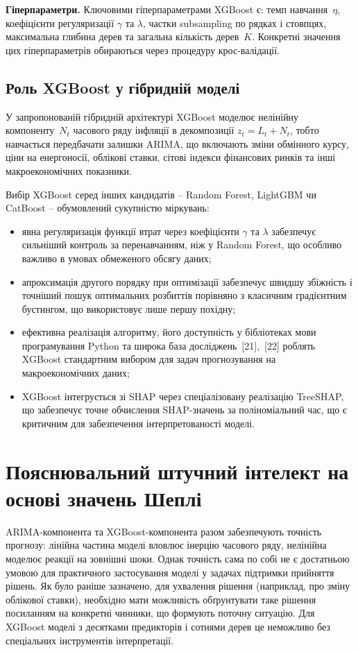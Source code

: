 \documentclass{bachelor_thesis}
\begin{document}
\textbf{Гіперпараметри.} Ключовими гіперпараметрами XGBoost є: темп навчання~$\eta$, коефіцієнти регуляризації $\gamma$ та $\lambda$, частки subsampling по рядках і стовпцях, максимальна глибина дерев та загальна кількість дерев~$K$. Конкретні значення цих гіперпараметрів обираються через процедуру крос-валідації.

\subsection{Роль XGBoost у гібридній моделі}

У запропонованій гібридній архітектурі XGBoost моделює нелінійну компоненту~$N_t$ часового ряду інфляції в декомпозиції $z_t = L_t + N_t$, тобто навчається передбачати залишки ARIMA, що включають зміни обмінного курсу, ціни на енергоносії, облікові ставки, сітові індекси фінансових ринків та інші макроекономічних показники.

Вибір XGBoost серед інших кандидатів -- Random Forest, LightGBM чи CatBoost -- обумовлений сукупністю міркувань:

\begin{itemize}
    \item явна регуляризація функції втрат через коефіцієнти $\gamma$ та $\lambda$ забезпечує сильніший контроль за перенавчанням, ніж у Random Forest, що особливо важливо в умовах обмеженого обсягу даних;
    \item апроксимація другого порядку при оптимізації забезпечує швидшу збіжність і точніший пошук оптимальних розбиттів порівняно з класичним градієнтним бустингом, що використовує лише першу похідну;
    \item ефективна реалізація алгоритму, його доступність у бібліотеках мови програмування Python та широка база досліджень~[21],~[22] роблять XGBoost стандартним вибором для задач прогнозування на макроекономічних даних;
    \item XGBoost інтегрується зі SHAP через спеціалізовану реалізацію TreeSHAP, що забезпечує точне обчислення SHAP-значень за поліноміальний час, що є критичним для забезпечення інтерпретованості моделі.
\end{itemize}

\section{Пояснювальний штучний інтелект на основі значень Шеплі}

ARIMA-компонента та XGBoost-компонента разом забезпечують точність прогнозу: лінійна частина моделі вловлює інерцію часового ряду, нелінійна моделює реакції на зовнішні шоки. Однак точність сама по собі не є достатньою умовою для практичного застосування моделі у задачах підтримки прийняття рішень. Як було раніше зазначено, для ухвалення рішення (наприклад, про зміну облікової ставки), необхідно мати можливість обґрунтувати таке рішення посиланням на конкретні чинники, що формують поточну ситуацію. Для XGBoost моделі з десятками предикторів і сотнями дерев це неможливо без спеціальних інструментів інтерпретації.
\end{document}
